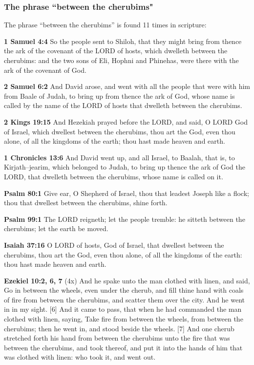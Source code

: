 \subsubsection{The phrase ``between the cherubims"}

The phrase ``between the cherubims'' is found 11 times in scripture:
\begin{compactenum}
    \item \textbf{1 Samuel 4:4} So the people sent to Shiloh, that they might bring from thence the ark of the covenant of the LORD of hosts, which dwelleth between the cherubims: and the two sons of Eli, Hophni and Phinehas, were there with the ark of the covenant of God.
    \item \textbf{2 Samuel 6:2} And David arose, and went with all the people that were with him from Baale of Judah, to bring up from thence the ark of God, whose name is called by the name of the LORD of hosts that dwelleth between the cherubims.
    \item \textbf{2 Kings 19:15} And Hezekiah prayed before the LORD, and said, O LORD God of Israel, which dwellest between the cherubims, thou art the God, even thou alone, of all the kingdoms of the earth; thou hast made heaven and earth.
    \item \textbf{1 Chronicles 13:6} And David went up, and all Israel, to Baalah, that is, to Kirjath–jearim, which belonged to Judah, to bring up thence the ark of God the LORD, that dwelleth between the cherubims, whose name is called on it.
    \item \textbf{Psalm 80:1} Give ear, O Shepherd of Israel, thou that leadest Joseph like a flock; thou that dwellest between the cherubims, shine forth.
    \item \textbf{Psalm 99:1} The LORD reigneth; let the people tremble: he sitteth between the cherubims; let the earth be moved.
    \item \textbf{Isaiah 37:16} O LORD of hosts, God of Israel, that dwellest between the cherubims, thou art the God, even thou alone, of all the kingdoms of the earth: thou hast made heaven and earth.
    \item \textbf{Ezekiel 10:2, 6, 7} (4x) And he spake unto the man clothed with linen, and said, Go in between the wheels, even under the cherub, and fill thine hand with coals of fire from between the cherubims, and scatter them over the city. And he went in in my sight. [6] And it came to pass, that when he had commanded the man clothed with linen, saying, Take fire from between the wheels, from between the cherubims; then he went in, and stood beside the wheels. [7] And one cherub stretched forth his hand from between the cherubims unto the fire that was between the cherubims, and took thereof, and put it into the hands of him that was clothed with linen: who took it, and went out.
\end{compactenum}